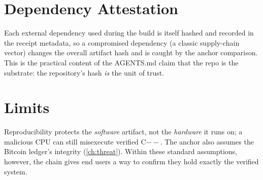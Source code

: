 \section{Dependency Attestation}
\label{sec:supply-dep}

Each external dependency used during the build is itself hashed and
recorded in the receipt metadata, so a compromised dependency (a classic
supply-chain vector) changes the overall artifact hash and is caught by
the anchor comparison. This is the practical content of the
AGENTS.md claim that the repo is the substrate: the repository's hash
\emph{is} the unit of trust.

\section{Limits}
\label{sec:supply-limits}

Reproducibility protects the \emph{software} artifact, not the
\emph{hardware} it runs on; a malicious CPU can still misexecute verified
C$--$. The anchor also assumes the Bitcoin ledger's integrity
(\cref{ch:threat}). Within these standard assumptions, however, the chain
gives end users a way to confirm they hold exactly the verified system.
